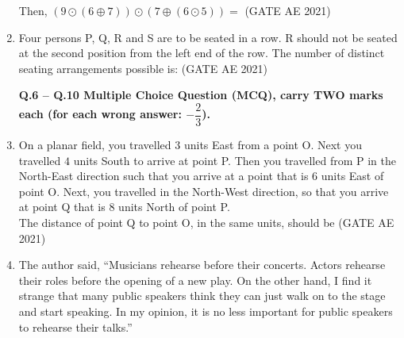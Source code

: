 \documentclass[journal,12pt,onecolumn]{IEEEtran}
\theoremstyle{remark}
\begin{document}
\begin{flushleft}
\begin{enumerate}
Then, $(9 \odot (6 \oplus 7)) \odot (7 \oplus (6 \odot 5)) =$ 
\hfill (GATE AE 2021)
\begin{enumerate}
\end{enumerate}


\item 
Four persons P, Q, R and S are to be seated in a row. R should not be seated at the second position from the left end of the row. The number of distinct seating arrangements possible is:
\hfill (GATE AE 2021)
\begin{enumerate}
\end{enumerate}
\textbf{Q.6 -- Q.10 Multiple Choice Question (MCQ), carry TWO marks each (for each wrong answer: $-\dfrac{2}{3}$).}

\item 
On a planar field, you travelled $3$ units East from a point O. Next you travelled $4$ units South to arrive at point P. Then you travelled from P in the North-East direction such that you arrive at a point that is $6$ units East of point O. Next, you travelled in the North-West direction, so that you arrive at point Q that is $8$ units North of point P. \\

The distance of point Q to point O, in the same units, should be \underline{\hspace{2cm}}
\hfill (GATE AE 2021)
\begin{enumerate}
\end{enumerate}

\item 
The author said, ``Musicians rehearse before their concerts. Actors rehearse their roles before the opening of a new play. On the other hand, I find it strange that many public speakers think they can just walk on to the stage and start speaking. In my opinion, it is no less important for public speakers to rehearse their talks.'' \\


\end{enumerate}
\end{flushleft}
\end{document}
